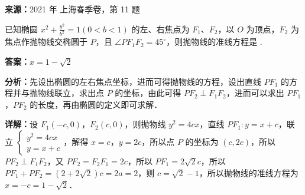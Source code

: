 \begin{question}[points=5]
\textbf{来源：}2021 年 上海春季卷，第 11 题\par
已知椭圆 $x^2+\frac{y^2}{b^2}=1(0<b<1)$ 的左、右焦点为 $F_1$、$F_2$，以 $O$ 为顶点，$F_2$ 为焦点作抛物线交椭圆于 $P$，且 $\angle PF_1F_2=45^\circ$，则抛物线的准线方程是  .
\fillin[{$x=1-\sqrt{2}$}]
\begin{solution}
\textbf{答案：}$x=1-\sqrt{2}$

\textbf{分析：}先设出椭圆的左右焦点坐标，进而可得抛物线的方程，设出直线 $PF_1$ 的方程并与抛物线联立，求出点 $P$ 的坐标，由此可得 $PF_2\perp F_1F_2$，进而可以求出 $PF_1$，$PF_2$ 的长度，再由椭圆的定义即可求解．

\textbf{详解：}设 $F_1(-c,0)$，$F_2(c,0)$，则抛物线 $y^2=4cx$，直线 $PF_1:y=x+c$，联立 $\begin{cases} y^2=4cx \\ y=x+c \end{cases}$，解得 $x=c$，$y=2c$，所以点 $P$ 的坐标为 $(c,2c)$，所以 $PF_2\perp F_1F_2$，又 $PF_2=F_2F_1=2c$，所以 $PF_1=2\sqrt{2}c$，所以 $PF_1+PF_2=(2+2\sqrt{2})c=2a=2$，则 $c=\sqrt{2}-1$，所以抛物线的准线方程为 $x=-c=1-\sqrt{2}$．
\end{solution}
\end{question}

